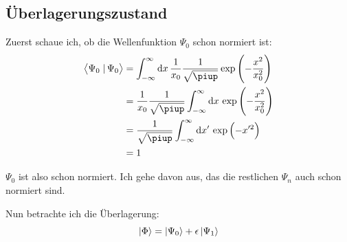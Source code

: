 \subsection{Überlagerungszustand}

Zuerst schaue ich, ob die Wellenfunktion $\Psi_0$ schon normiert ist:
\begin{align*}
	\braket{\Psi_0}{\Psi_0}
	&= \int_{-\infty}^\infty \dif x \, \frac{1}{x_0} \frac{1}{\sqrt\piup} \exp\del{-\frac{x^2}{x_0^2}} \\
	&= \frac{1}{x_0} \frac{1}{\sqrt\piup} \int_{-\infty}^\infty \dif x \, \exp\del{-\frac{x^2}{x_0^2}} \\
	&= \frac{1}{\sqrt\piup} \int_{-\infty}^\infty \dif x' \, \exp\del{-x'^2} \\
	&= 1
\end{align*}

$\Psi_0$ ist also schon normiert. Ich gehe davon aus, das die restlichen
$\Psi_n$ auch schon normiert sind.

Nun betrachte ich die Überlagerung:
\[
	\left| \Phi \right\rangle = \left| \Psi_0 \right\rangle + \epsilon \left| \Psi_1 \right\rangle
\]

